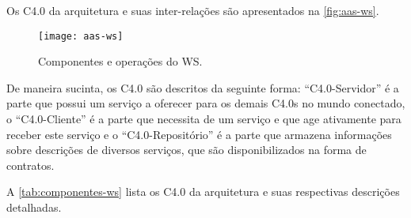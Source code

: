 Os C4.0 da arquitetura e suas inter-relações são apresentados na \autoref{fig:aas-ws}.

\begin{figure}[t]
	\centering
	\texttt{[image: aas-ws]}
	\caption{Componentes e operações do WS.}
	\label{fig:aas-ws}
\end{figure}

De maneira sucinta, os C4.0 são descritos da seguinte forma: ``C4.0-Servidor'' é a parte que possui um serviço a oferecer para os demais C4.0s no mundo conectado, o ``C4.0-Cliente'' é a parte que necessita de um serviço e que age ativamente para receber este serviço e o ``C4.0-Repositório'' é a parte que armazena informações sobre descrições de diversos serviços, que são disponibilizados na forma de contratos.

A \autoref{tab:componentes-ws} lista os C4.0 da arquitetura e suas respectivas descrições detalhadas.

